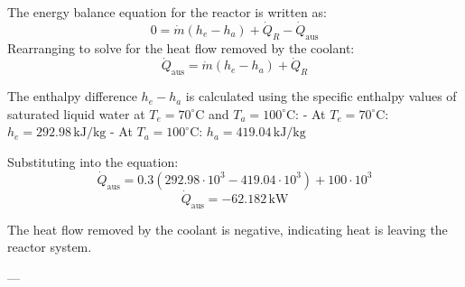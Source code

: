 The energy balance equation for the reactor is written as:  
\[
0 = \dot{m}(h_e - h_a) + \dot{Q}_R - \dot{Q}_{\text{aus}}
\]  
Rearranging to solve for the heat flow removed by the coolant:  
\[
\dot{Q}_{\text{aus}} = \dot{m}(h_e - h_a) + \dot{Q}_R
\]  

The enthalpy difference \( h_e - h_a \) is calculated using the specific enthalpy values of saturated liquid water at \( T_e = 70^\circ\text{C} \) and \( T_a = 100^\circ\text{C} \):  
- At \( T_e = 70^\circ\text{C} \): \( h_e = 292.98 \, \text{kJ/kg} \)  
- At \( T_a = 100^\circ\text{C} \): \( h_a = 419.04 \, \text{kJ/kg} \)  

Substituting into the equation:  
\[
\dot{Q}_{\text{aus}} = 0.3 \left(292.98 \cdot 10^3 - 419.04 \cdot 10^3\right) + 100 \cdot 10^3
\]  
\[
\dot{Q}_{\text{aus}} = -62.182 \, \text{kW}
\]  

The heat flow removed by the coolant is negative, indicating heat is leaving the reactor system.  

---